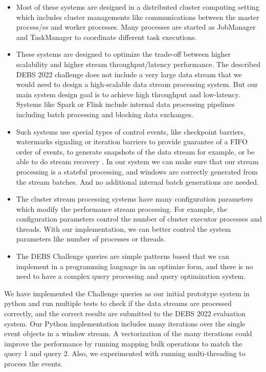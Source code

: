 \begin{itemize}
    \item Most of these systems are designed in a distributed cluster computing setting which includes cluster managements like communications between the master process/es and worker processes.
    Many processes are started as JobManager and TaskManager to coordinate different task executions. 

    \item These systems are designed to optimize the trade-off between higher scalability and higher stream throughput/latency performance. 
    The described DEBS 2022 challenge does not include a very large data stream that we would need to design a high-scalable data stream processing system. 
    But our main system design goal is to achieve high throughput and low-latency. 
    Systems like Spark or Flink include internal data processing pipelines including batch processing and blocking data exchanges. 
    
    \item Such systems use special types of control events, like  checkpoint barriers, watermarks signaling or iteration barriers to provide guarantee of a FIFO order of
     events, to generate snapshots of the data stream for example, or be able to do stream recovery \cite{df177547a4364bb0a7e2470b83025bb0}. 
    In our system we can make sure that our stream processing is a stateful processing, and windows are correctly generated from the stream batches. 
    And no additional internal batch generations are needed. 

    \item The cluster stream processing systems have many configuration parameters which modify the performance stream processing. 
    For example, the configuration parameters control the number of cluster executor processes and threads. 
    With our implementation, we can better control the system parameters like number of processes or threads. 

    \item The DEBS Challenge queries are simple patterns based that we can implement in a programming language in an optimize form, and 
    there is no need to have a complex query processing and query optimization system. 

\end{itemize}


We have implemented the Challenge queries as our initial prototype system in python and run multiple tests to check if the data streams are processed correctly, and the correct
results are submitted to the DEBS 2022 evaluation system. Our Python implementation includes many iterations over the single event objects in a window stream. A vectorization of the
many iterations could improve the performance by running mapping bulk operations to match the query 1 and query 2. Also, we experimented with running multi-threading to process the events. 

